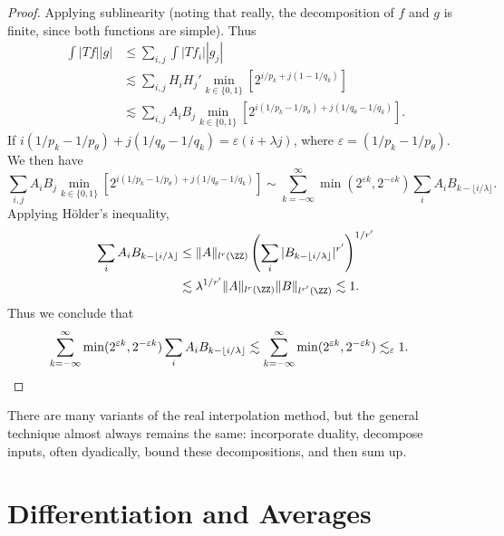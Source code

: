 \begin{proof}
  Applying sublinearity (noting that really, the decomposition of $f$ and $g$ is finite, since both functions are simple). Thus
  \begin{align*}
    \int |Tf| |g| &\leq \sum_{i,j} \int |Tf_i| |g_j|\\
    &\lesssim \sum_{i,j} H_i H_j' \min_{k \in \{0,1\}} \left[ 2^{i/p_k + j(1 - 1/q_k)} \right]\\
    &\lesssim \sum_{i,j} A_i B_j \min_{k \in \{ 0, 1 \}} \left[ 2^{i(1/p_k - 1/p_\theta) + j(1/q_\theta - 1/q_k)} \right].
  \end{align*}
  If $i(1/p_k - 1/p_\theta) + j(1/q_\theta - 1/q_k) = \varepsilon(i + \lambda j)$, where $\varepsilon = (1/p_k - 1/p_\theta)$. We then have
  \[ \sum_{i,j} A_i B_j \min_{k \in \{ 0, 1 \}} \left[ 2^{i(1/p_k - 1/p_\theta) + j(1/q_\theta - 1/q_k)} \right] \sim \sum_{k = -\infty}^\infty \min(2^{\varepsilon k}, 2^{-\varepsilon k}) \sum_i A_i B_{k - \lfloor i/\lambda \rfloor}. \]
  Applying H\"{o}lder's inequality,
  \begin{align*}
    \sum_i A_i B_{k - \lfloor i/\lambda \rfloor} &\leq \| A \|_{l^r(\ZZ)} \left( \sum_i |B_{k - \lfloor i/\lambda \rfloor}|^{r'} \right)^{1/r'}\\
    &\lesssim \lambda^{1/r'} \| A \|_{l^r(\ZZ)} \| B \|_{l^{r'}(\ZZ)} \lesssim 1.
  \end{align*}
  Thus we conclude that
  \begin{align*}
    \sum_{k = -\infty}^\infty \min(2^{\varepsilon k}, 2^{-\varepsilon k}) \sum_i A_i B_{k - \lfloor i/\lambda \rfloor} &\lesssim \sum_{k = -\infty}^\infty \min(2^{\varepsilon k}, 2^{-\varepsilon k}) \lesssim_\varepsilon 1. \qedhere
  \end{align*}
\end{proof}

There are many variants of the real interpolation method, but the general technique almost always remains the same: incorporate duality, decompose inputs, often dyadically, bound these decompositions, and then sum up.










\chapter{Differentiation and Averages}

